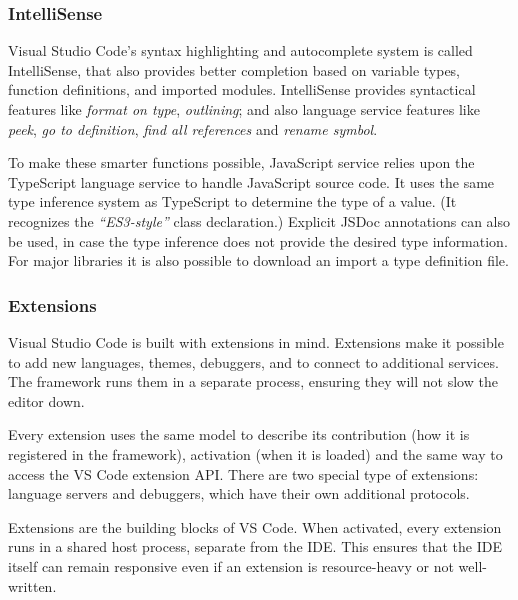 \subsubsection{IntelliSense}
Visual Studio Code's syntax highlighting and autocomplete system is called IntelliSense, that also provides better completion based on variable types, function definitions, and imported modules. IntelliSense provides syntactical features like \emph{format on type}, \emph{outlining}; and also language service features like \emph{peek}, \emph{go to definition}, \emph{find all references} and \emph{rename symbol}.

To make these smarter functions possible, JavaScript service relies upon the TypeScript language service to handle JavaScript source code. It uses the same type inference system as TypeScript to determine the type of a value. (It recognizes the \emph{``ES3-style''} class declaration.) Explicit JSDoc annotations can also be used, in case the type inference does not provide the desired type information. For major libraries it is also possible to download an import a type definition file.

\subsubsection{Extensions}
Visual Studio Code is built with extensions in mind. Extensions make it possible to add new languages, themes, debuggers, and to connect to additional services. The framework runs them in a separate process, ensuring they will not slow the editor down.

Every extension uses the same model to describe its contribution (how it is registered in the framework), activation (when it is loaded) and the same way to access the VS Code extension API. There are two special type of extensions: language servers and debuggers, which have their own additional protocols.

Extensions are the building blocks of VS Code. When activated, every extension runs in a shared host process, separate from the IDE. This ensures that the IDE itself can remain responsive even if an extension is resource-heavy or not well-written.

